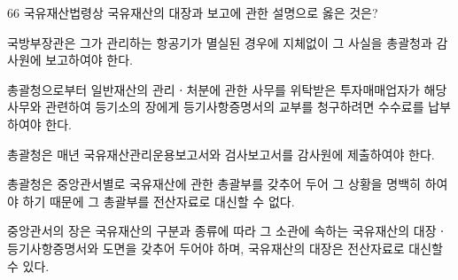 \begin{question}{66}
국유재산법령상 국유재산의 대장과 보고에 관한 설명으로 옳은 것은?
\begin{choices}
  \item 국방부장관은 그가 관리하는 항공기가 멸실된 경우에 지체없이 그 사실을 총괄청과 감사원에 보고하여야 한다.
  \item 총괄청으로부터 일반재산의 관리ㆍ처분에 관한 사무를 위탁받은 투자매매업자가 해당 사무와 관련하여 등기소의 장에게 등기사항증명서의 교부를 청구하려면 수수료를 납부하여야 한다.
  \item 총괄청은 매년 국유재산관리운용보고서와 검사보고서를 감사원에 제출하여야 한다.
  \item 총괄청은 중앙관서별로 국유재산에 관한 총괄부를 갖추어 두어 그 상황을 명백히 하여야 하기 때문에 그 총괄부를 전산자료로 대신할 수 없다.
  \item 중앙관서의 장은 국유재산의 구분과 종류에 따라 그 소관에 속하는 국유재산의 대장ㆍ등기사항증명서와 도면을 갖추어 두어야 하며, 국유재산의 대장은 전산자료로 대신할 수 있다.
\end{choices}
\end{question}
